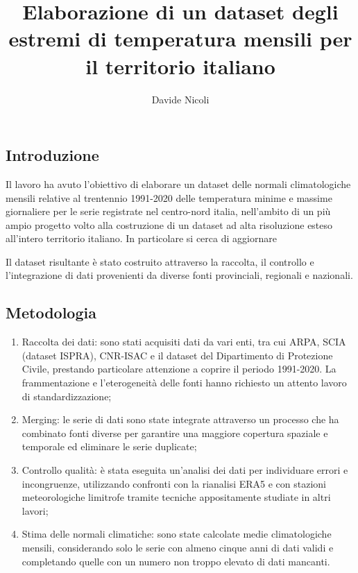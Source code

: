 \documentclass[
]{article}
\title{Elaborazione di un dataset degli estremi di temperatura mensili
per il territorio italiano}
\author{Davide Nicoli}
\date{}
\providecommand{\tightlist}{%
  \setlength{\itemsep}{0pt}\setlength{\parskip}{0pt}}
\begin{document}
\maketitle

\subsection{Introduzione}\label{introduzione}

Il lavoro ha avuto l'obiettivo di elaborare un dataset delle normali
climatologiche mensili relative al trentennio 1991-2020 delle
temperatura minime e massime giornaliere per le serie registrate nel
centro-nord italia, nell'ambito di un più ampio progetto volto alla
costruzione di un dataset ad alta risoluzione esteso all'intero
territorio italiano. In particolare si cerca di aggiornare

Il dataset risultante è stato costruito attraverso la raccolta, il
controllo e l'integrazione di dati provenienti da diverse fonti
provinciali, regionali e nazionali.

\subsection{Metodologia}\label{metodologia}

\begin{enumerate}
\def\labelenumi{\arabic{enumi}.}
\tightlist
\item
  Raccolta dei dati: sono stati acquisiti dati da vari enti, tra cui
  ARPA, SCIA (dataset ISPRA), CNR-ISAC e il dataset del Dipartimento di
  Protezione Civile, prestando particolare attenzione a coprire il
  periodo 1991-2020. La frammentazione e l'eterogeneità delle fonti
  hanno richiesto un attento lavoro di standardizzazione;
\item
  Merging: le serie di dati sono state integrate attraverso un processo
  che ha combinato fonti diverse per garantire una maggiore copertura
  spaziale e temporale ed eliminare le serie duplicate;
\item
  Controllo qualità: è stata eseguita un'analisi dei dati per
  individuare errori e incongruenze, utilizzando confronti con la
  rianalisi ERA5 e con stazioni meteorologiche limitrofe tramite
  tecniche appositamente studiate in altri lavori;
\item
  Stima delle normali climatiche: sono state calcolate medie
  climatologiche mensili, considerando solo le serie con almeno cinque
  anni di dati validi e completando quelle con un numero non troppo
  elevato di dati mancanti.
\end{enumerate}
\end{document}
